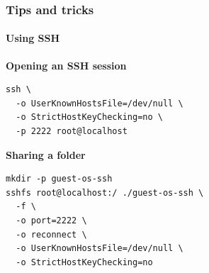 

\begin{frame}[fragile]
  \frametitle{Tips and tricks}
  \framesubtitle{Using SSH}
  \begin{center}
    \textbf{Opening an SSH session}
  \end{center}
  \begin{verbatim}
ssh \
  -o UserKnownHostsFile=/dev/null \
  -o StrictHostKeyChecking=no \
  -p 2222 root@localhost
  \end{verbatim}

  \begin{center}
    \textbf{Sharing a folder}
  \end{center}
  \begin{verbatim}
mkdir -p guest-os-ssh
sshfs root@localhost:/ ./guest-os-ssh \
  -f \
  -o port=2222 \
  -o reconnect \
  -o UserKnownHostsFile=/dev/null \
  -o StrictHostKeyChecking=no
  \end{verbatim}
\end{frame}

